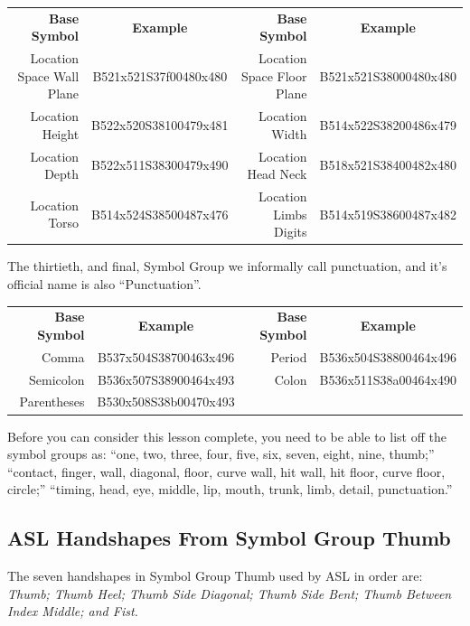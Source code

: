 \documentclass{article}
\begin{document}
\begin{center}
\begin{tabular}{rcrc}
\textbf{Base Symbol}&\textbf{Example}&\textbf{Base Symbol}&\textbf{Example}\\
Location Space Wall Plane&B521x521S37f00480x480&Location Space Floor Plane&B521x521S38000480x480\\
Location Height          &B522x520S38100479x481&Location Width            &B514x522S38200486x479\\
Location Depth           &B522x511S38300479x490&Location Head Neck        &B518x521S38400482x480\\
Location Torso           &B514x524S38500487x476&Location Limbs Digits     &B514x519S38600487x482\\
\end{tabular}
\end{center}

The thirtieth, and final, Symbol Group we informally call punctuation, and it's official name is also ``Punctuation''.

\begin{center}
\begin{tabular}{rcrc}
\textbf{Base Symbol}&\textbf{Example}&\textbf{Base Symbol}&\textbf{Example}\\
Comma      &B537x504S38700463x496&Period&B536x504S38800464x496\\
Semicolon  &B536x507S38900464x493&Colon &B536x511S38a00464x490\\
Parentheses&B530x508S38b00470x493\\
\end{tabular}
\end{center}

Before you can consider this lesson complete, you need to be able to list off the symbol groups as:
``one, two, three, four, five, six, seven, eight, nine, thumb;''
``contact, finger, wall, diagonal, floor, curve wall, hit wall, hit floor, curve floor, circle;''
``timing, head, eye, middle, lip, mouth, trunk, limb, detail, punctuation.''

\subsection{ASL Handshapes From Symbol Group Thumb}

The seven handshapes in Symbol Group Thumb used by ASL in order are:
{\it
Thumb;
Thumb Heel;
Thumb Side Diagonal;
Thumb Side Bent;
Thumb Between Index Middle;
and Fist.
}
\end{document}

